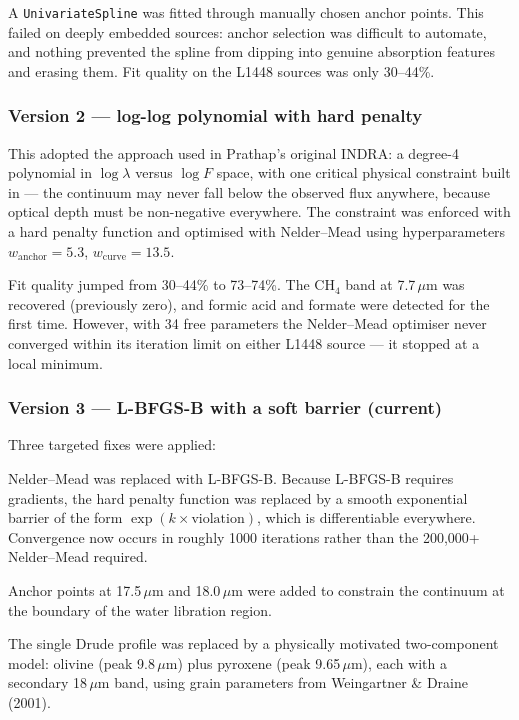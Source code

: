 \documentclass[11pt,a4paper]{article}
\newcommand{\um}{\,$\mu$m}
\newcommand{\code}[1]{\texttt{\small #1}}
\begin{document}
A \code{UnivariateSpline} was fitted through manually chosen anchor points.
This failed on deeply embedded sources: anchor selection was difficult to
automate, and nothing prevented the spline from dipping into genuine
absorption features and erasing them. Fit quality on the L1448 sources was
only 30--44\%.

\subsubsection*{Version 2 --- log-log polynomial with hard penalty}

This adopted the approach used in Prathap's original INDRA: a degree-4
polynomial in $\log\lambda$ versus $\log F$ space, with one critical
physical constraint built in --- the continuum may never fall below the
observed flux anywhere, because optical depth must be non-negative
everywhere. The constraint was enforced with a hard penalty function and
optimised with Nelder--Mead using hyperparameters $w_{\text{anchor}} =
5.3$, $w_{\text{curve}} = 13.5$.

Fit quality jumped from 30--44\% to 73--74\%. The CH$_4$ band at 7.7\um{}
was recovered (previously zero), and formic acid and formate were detected
for the first time. However, with 34 free parameters the Nelder--Mead
optimiser never converged within its iteration limit on either L1448
source --- it stopped at a local minimum.

\subsubsection*{Version 3 --- L-BFGS-B with a soft barrier (current)}

Three targeted fixes were applied:

\begin{description}[style=nextline, leftmargin=0pt, labelindent=0pt, labelwidth=0pt, labelsep=0pt, itemsep=4pt]
  \item[Fix 1 --- gradient-based optimiser.]
  Nelder--Mead was replaced with L-BFGS-B. Because L-BFGS-B requires
  gradients, the hard penalty function was replaced by a smooth
  exponential barrier of the form $\exp(k \times \text{violation})$, which
  is differentiable everywhere. Convergence now occurs in roughly 1000
  iterations rather than the 200{,}000+ Nelder--Mead required.

  \item[Fix 2 --- additional long-wavelength anchors.]
  Anchor points at 17.5\um{} and 18.0\um{} were added to constrain the
  continuum at the boundary of the water libration region.

  \item[Fix 3 --- two-component silicate model.]
  The single Drude profile was replaced by a physically motivated
  two-component model: olivine (peak 9.8\um) plus pyroxene (peak
  9.65\um), each with a secondary 18\um{} band, using grain parameters
  from Weingartner \& Draine (2001).
\end{description}
\end{document}
